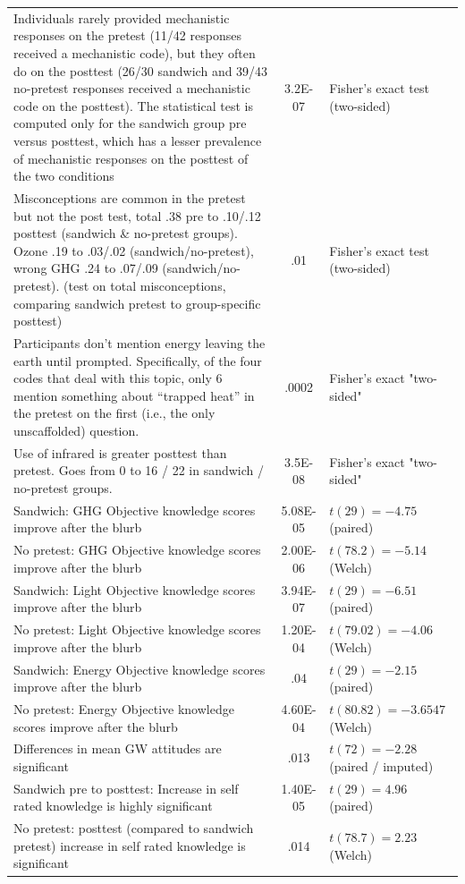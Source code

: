 \begin{longtabu}{X[2.5]S[table-parse-only]X[l]}
Individuals rarely provided mechanistic responses on the pretest 
(11/42 responses received a mechanistic code), but they often do on the
posttest (26/30 sandwich and 39/43 no-pretest responses received a mechanistic
code on the posttest). The statistical test is computed only for the sandwich
group pre versus
posttest, which has a lesser prevalence of mechanistic responses on the posttest
of the two conditions &	3.2E-07	&
Fisher's exact test (two-sided)	\\
Misconceptions are common in the pretest but not the post test, total .38 pre
to .10/.12 posttest (sandwich \& no-pretest groups). Ozone .19 to .03/.02
(sandwich/no-pretest),  wrong
GHG  .24 to .07/.09 (sandwich/no-pretest). (test on total misconceptions, comparing sandwich
pretest to group-specific posttest)	&	.01	&	Fisher's exact test (two-sided)	\\
Participants don't mention energy leaving the earth until prompted.
Specifically, of the four codes that deal with this topic, only 6 mention
something about “trapped heat” in the pretest on the first (i.e., the only
unscaffolded) question.	&	.0002	&	Fisher's exact "two-sided"	\\
Use of infrared is greater posttest than pretest. Goes from 0 to 16 / 22 in
sandwich
/ no-pretest groups.	&	3.5E-08	&	Fisher's exact "two-sided"	\\
Sandwich: GHG Objective knowledge scores improve after the blurb	&	5.08E-05
&	$t(29) = -4.75$ (paired)	\\
No pretest: GHG Objective knowledge scores improve after the blurb	&	2.00E-06
&	$t(78.2) = -5.14$ (Welch)	\\
Sandwich: Light Objective knowledge scores improve after the blurb	&	3.94E-07
&	$t(29) = -6.51$ (paired)	\\
No pretest: Light Objective knowledge scores improve after the blurb	&	1.20E-04
&	$t(79.02) = -4.06$ (Welch)	\\
Sandwich: Energy Objective knowledge scores improve after the blurb	&	.04
&	$t(29) = -2.15$ (paired)	\\
No pretest: Energy Objective knowledge scores improve after the blurb	&
4.60E-04	&	$t(80.82) = -3.6547$ (Welch)	\\
Differences in mean GW attitudes are significant	&	.013	&	$t(72) = -2.28$
(paired / imputed)	\\
Sandwich pre to posttest: Increase in self rated knowledge is highly
significant	&	1.40E-05	&	$t(29) = 4.96$ (paired)	\\
No pretest: posttest (compared to sandwich pretest) increase in self rated knowledge
is significant	&	.014	&	$t(78.7) = 2.23$ (Welch)	\\
					
\end{longtabu}


